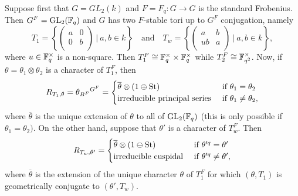 \begin{example}
    Suppose first that $G=GL_2(k)$ and $F=F_q:G\rightarrow G$ is the standard Frobenius. Then $G^F=\mathrm{GL}_2(\mathbb{F}_q)$ and $G$ has two $F$-stable tori up to $G^F$ conjugation, namely
    \begin{equation*}
        T_1=\left\{\begin{pmatrix}
            a & 0\\
            0 & b\\
        \end{pmatrix}\ |\ a,b\in k\right\}\quad\text{and}\quad T_w=\left\{\begin{pmatrix}
            a & b\\
            ub & a\\
        \end{pmatrix}\ |\ a,b\in k\right\},
    \end{equation*}
    where $u\in\mathbb{F}_q^\times$ is a non-square. 
    Then $T_1^F\cong \mathbb{F}_q^\times\times\mathbb{F}_q^\times$ while $T_2^F\cong\mathbb{F}_{q^2}^\times$. Now, if $\theta=\theta_1\otimes\theta_2$ is a character of $T_1^F$, then 
    $$R_{T_1,\theta}={\theta_{B^F}}^{G^F}=\begin{cases}
        \overline{\theta}\otimes(1\oplus\mathrm{St}) &\text{ if } \theta_1=\theta_2\\
        \text{irreducible principal series} & \text{ if }\theta_1\neq\theta_2,
    \end{cases}$$
    where $\overline{\theta}$ is the unique extension of $\theta$ to all of $\mathrm{GL}_2(\mathbb{F}_q)$ (this is only possible if $\theta_1=\theta_2)$.
    On the other hand, suppose that $\theta'$ is a character of $T_w^F$. Then
    $$R_{T_w,\theta'}=\begin{cases}
        \overline{\theta}\otimes(1\ominus\mathrm{St}) &\text{ if } \theta'^q=\theta'\\
        \text{irreducible cuspidal} & \text{ if }\theta'^q\neq\theta',
    \end{cases}$$
    where $\overline{\theta}$ is the extension of the unique character $\theta$ of $T_1^F$ for which $(\theta,T_1)$ is geometrically conjugate to $(\theta',T_w)$.


    
\end{example}


